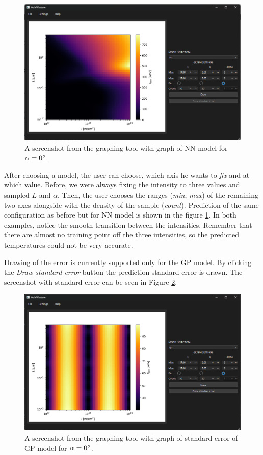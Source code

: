 \begin{figure}[h]
	\centering
	\includegraphics[width=0.85 \textwidth]{figures/graph_tool2}
	\caption{A screenshot from the graphing tool with graph of NN model for $\alpha = 0\degree$.}
	\label{fig:graph-tool2}
\end{figure}


After choosing a model, the user can choose, which axis he wants to \textit{fix} and at which value. Before, we were always fixing the intensity to three values and sampled $L$ and $\alpha$. Then, the user chooses the ranges (\textit{min}, \textit{max}) of the remaining two axes alongside with the density of the sample (\textit{count}). Prediction of the same configuration as before but for NN model is shown in the figure \ref{fig:graph-tool2}. In both examples, notice the smooth transition between the intensities. Remember that there are almost no training point off the three intensities, so the predicted temperatures could not be very accurate.

Drawing of the error is currently supported only for the GP model. By clicking the \textit{Draw standard error} button the prediction standard error is drawn. The screenshot with standard error can be seen in Figure \ref{fig:graph-tool3}.

\begin{figure}[h]
	\centering
	\includegraphics[width=0.85 \textwidth]{figures/graph_tool3}
	\caption{A screenshot from the graphing tool with graph of standard error of GP model for $\alpha = 0\degree$.}
	\label{fig:graph-tool3}
\end{figure}

